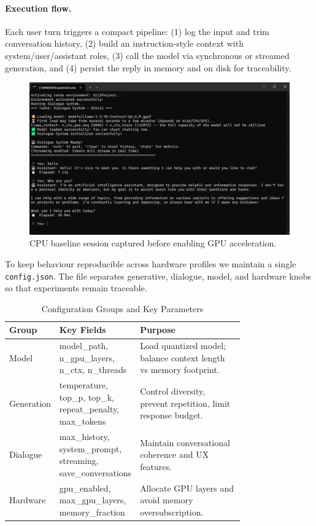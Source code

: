 \documentclass[12pt,a4paper]{article}
\begin{document}
\paragraph{Execution flow.}
Each user turn triggers a compact pipeline: (1) log the input and trim conversation history, (2) build an instruction-style context with system/user/assistant roles, (3) call the model via synchronous or streamed generation, and (4) persist the reply in memory and on disk for traceability.

\begin{figure}[H]
    \centering
    \includegraphics[width=0.95\linewidth]{Figures/llama对话.png}
    \caption{CPU baseline session captured before enabling GPU acceleration.}
    \label{fig:llama_cpu_chat}
\end{figure}

To keep behaviour reproducible across hardware profiles we maintain a single \texttt{config.json}. The file separates generative, dialogue, model, and hardware knobs so that experiments remain traceable.

\begin{table}[H]
\centering
\caption{Configuration Groups and Key Parameters}
\label{tab:config_params}
\begin{tabular}{|l|p{0.26\linewidth}|p{0.5\linewidth}|}
\hline
	\textbf{Group} & \textbf{Key Fields} & \textbf{Purpose} \\
\hline
Model & model\_path, n\_gpu\_layers, n\_ctx, n\_threads & Load quantized model; balance context length vs memory footprint. \\
Generation & temperature, top\_p, top\_k, repeat\_penalty, max\_tokens & Control diversity, prevent repetition, limit response budget. \\
Dialogue & max\_history, system\_prompt, streaming, save\_conversations & Maintain conversational coherence and UX features. \\
Hardware & gpu\_enabled, max\_gpu\_layers, memory\_fraction & Allocate GPU layers and avoid memory oversubscription. \\
\hline
\end{tabular}
\end{table}
\end{document}
